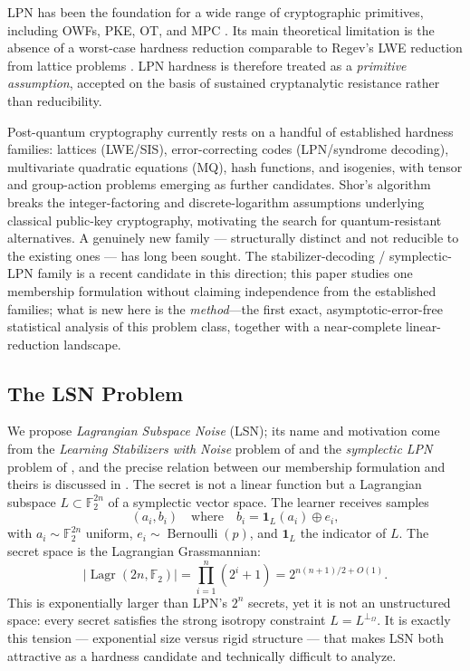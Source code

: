 \documentclass[11pt,a4paper]{article}
\theoremstyle{plain}
\theoremstyle{definition}
\newcommand{\F}{\mathbb{F}}
\DeclareMathOperator{\Lagr}{Lagr}
\begin{document}
LPN has been the foundation for a wide range of cryptographic primitives, including OWFs, PKE, OT, and MPC \cite{ABW10,Ale11,DGM12,BCGI18}. Its main theoretical limitation is the absence of a worst-case hardness reduction comparable to Regev's LWE reduction from lattice problems \cite{Reg05}. LPN hardness is therefore treated as a \emph{primitive assumption}, accepted on the basis of sustained cryptanalytic resistance rather than reducibility.

Post-quantum cryptography currently rests on a handful of established hardness families: lattices (LWE/SIS), error-correcting codes (LPN/syndrome decoding), multivariate quadratic equations (MQ), hash functions, and isogenies, with tensor and group-action problems emerging as further candidates. Shor's algorithm \cite{Sho94} breaks the integer-factoring and discrete-logarithm assumptions underlying classical public-key cryptography, motivating the search for quantum-resistant alternatives. A genuinely new family --- structurally distinct and not reducible to the existing ones --- has long been sought. The stabilizer-decoding / symplectic-LPN family is a recent candidate in this direction; this paper studies one membership formulation without claiming independence from the established families; what is new here is the \emph{method}---the first exact, asymptotic-error-free statistical analysis of this problem class, together with a near-complete linear-reduction landscape.

\subsection{The LSN Problem}
\label{subsec:lsn}

We propose \emph{Lagrangian Subspace Noise} (LSN); its name and motivation come from the \emph{Learning Stabilizers with Noise} problem of \cite{PQS26} and the \emph{symplectic LPN} problem of \cite{KLP+25,LPQR26}, and the precise relation between our membership formulation and theirs is discussed in . The secret is not a linear function but a Lagrangian subspace $L \subset \F_2^{2n}$ of a symplectic vector space. The learner receives samples
\[
(a_i, b_i) \quad \text{where} \quad b_i = \mathbf{1}_L(a_i) \oplus e_i,
\]
with $a_i \sim \F_2^{2n}$ uniform, $e_i \sim \operatorname{Bernoulli}(p)$, and $\mathbf{1}_L$ the indicator of $L$. The secret space is the Lagrangian Grassmannian:
\begin{equation}
\label{eq:lagr-count}
|\Lagr(2n, \F_2)| = \prod_{i=1}^n (2^i + 1) = 2^{n(n+1)/2 + O(1)}.
\end{equation}
This is exponentially larger than LPN's $2^n$ secrets, yet it is not an unstructured space: every secret satisfies the strong isotropy constraint $L = L^{\perp_\Omega}$. It is exactly this tension --- exponential size versus rigid structure --- that makes LSN both attractive as a hardness candidate and technically difficult to analyze.
\end{document}
